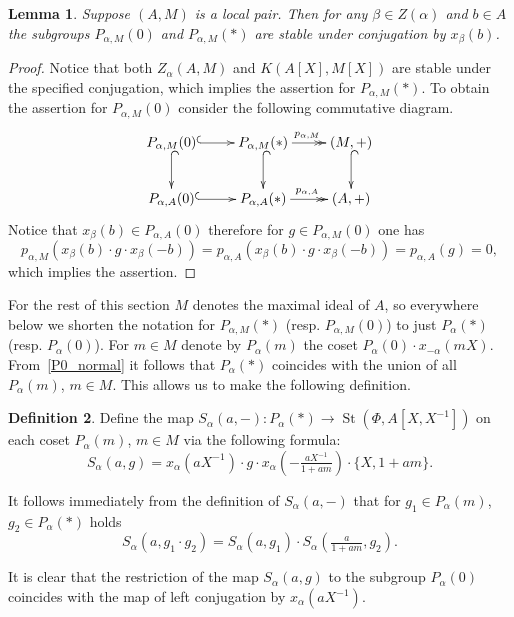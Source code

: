 \documentclass[oneside, 8pt]{amsart}
\newtheorem{lemma}{Lemma}
\theoremstyle{remark}
\theoremstyle{definition}
\numberwithin{lemma}{section}
\numberwithin{prop}{section}
\numberwithin{corollary}{section}
\numberwithin{externaltheorem}{section}
\newtheorem{df}[lemma]{Definition} \Crefname{df}{Definition}{Definitions}
\DeclareMathOperator{\St}{St}
\numberwithin{equation}{section}
\begin{document}
\begin{lemma} \label{P0-conj-invariant} Suppose $(A, M)$ is a local pair. Then for any $\beta \in Z(\alpha)$ and $b \in A$ the subgroups $P_{\alpha, M}(0)$ and $P_{\alpha, M}(*)$ are stable under conjugation by $x_\beta(b)$. \end{lemma}
\begin{proof}
Notice that both $Z_\alpha(A, M)$ and $K(A[X], M[X])$ are stable under the specified conjugation, which implies the assertion for $P_{\alpha, M}(*)$. 
To obtain the assertion for $P_{\alpha, M}(0)$ consider the following commutative diagram. \[ \xymatrix{ P_{\alpha, M}(0) \ar@{^{(}->}[r] \ar@{^{(}->}[d] & P_{\alpha, M}(*) \ar@{->>}[r]^{p_{\alpha, M}} \ar@{^{(}->}[d] & (M, +) \ar@{^{(}->}[d] \\ P_{\alpha, A}(0) \ar@{^{(}->}[r] & P_{\alpha, A}(*) \ar@{->>}[r]^{p_{\alpha, A}} & (A, +)} \]
Notice that $x_\beta(b) \in P_{\alpha, A}(0)$ therefore for $g \in P_{\alpha, M}(0)$ one has \[p_{\alpha, M}(x_\beta(b) \cdot g \cdot x_\beta(-b)) = p_{\alpha, A}(x_\beta(b) \cdot g \cdot x_\beta(-b)) = p_{\alpha, A}(g) = 0,\] which implies the assertion.\end{proof}

For the rest of this section $M$ denotes the maximal ideal of $A$, so everywhere below we shorten the notation for $P_{\alpha, M}(*)$ (resp. $P_{\alpha, M}(0)$) to just $P_{\alpha}(*)$ (resp. $P_{\alpha}(0)$). For $m \in M$ denote by $P_\alpha(m)$ the coset $P_\alpha(0) \cdot x_{-\alpha}(mX)$.
From~\cref{P0_normal} it follows that $P_\alpha(*)$ coincides with the union of all $P_\alpha(m)$, $m\in M$. This allows us to make the following definition. 

\begin{df} Define the map $S_\alpha(a, -) \colon P_\alpha(*) \to \St(\Phi, A[X, X^{-1}])$ on each coset $P_\alpha(m)$, $m \in M$ via the following formula:
\[ S_\alpha(a, g) = x_\alpha(aX^{-1})\cdot g \cdot x_\alpha\left(-\tfrac{aX^{-1}}{1 + am}\right) \cdot \{X, 1+ am\}.\] \end{df}
It follows immediately from the definition of $S_\alpha(a, -)$ that for $g_1 \in P_\alpha(m)$, $g_2 \in P_\alpha(*)$ holds
\begin{equation} \label{eq:Smult} S_\alpha(a, g_1\cdot g_2) = S_\alpha(a, g_1) \cdot S_\alpha\left(\tfrac{a}{1+am}, g_2\right).\end{equation}

It is clear that the restriction of the map $S_\alpha(a, g)$ to the subgroup $P_\alpha(0)$ coincides with the map of left conjugation by $x_\alpha(aX^{-1})$.
\end{document}

